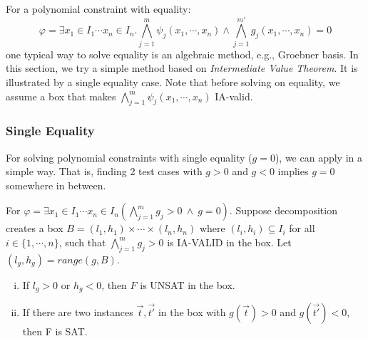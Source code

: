 \documentclass[runningheads,a4paper,oribibl]{llncs}
\begin{document}
For a polynomial constraint with equality:
\[\varphi = \exists x_1 \in I_1 \cdots x_n \in I_n.
\bigwedge \limits_{j=1}^m \psi_j(x_1,\cdots,x_n) \wedge
\bigwedge \limits_{j=1}^{m'} g_j(x_1,\cdots,x_n) = 0\]
one typical way to solve equality is an algebraic method, e.g., Groebner basis.
In this section, we try a simple method based on
{\em Intermediate Value Theorem}. It is illustrated by a single equality case.
Note that before solving on equality, we assume a box
that makes $\bigwedge \limits_{j=1}^m \psi_j(x_1,\cdots,x_n)$ IA-valid. 

\subsubsection{Single Equality}
For solving polynomial constraints with single equality (${g=0}$),
we can apply in a simple way. 
That is, finding 2 test cases with $g > 0$ and $g < 0$ implies 
$g=0$ somewhere in between. 

\begin{lemma} \label{lemma:ivt}
For $\varphi = \exists x_1 \in I_1 \cdots x_n \in I_n
(\bigwedge \limits_{j=1}^m g_j > 0~\wedge~g = 0)$.
Suppose decomposition creates a box
$B = (l_1, h_1) \times \cdots \times (l_n, h_n)$
where $(l_i, h_i) \subseteq I_i$ for all $i \in \{1, \cdots, n\}$,
such that $\bigwedge \limits_{j=1}^m g_j > 0$ is IA-VALID in the box.
Let $(l_g, h_g) = range(g, B)$.
\begin{enumerate}[(i)]
\item If $l_g > 0$ or $h_g < 0$, then $F$ is UNSAT in the box. 
\item If there are two instances $\vec{t},\vec{t'}$ in the box
  with $g(\vec{t}) > 0$ and $g(\vec{t'}) < 0$, then F is SAT.
\end{enumerate}
\end{lemma}
\end{document}
